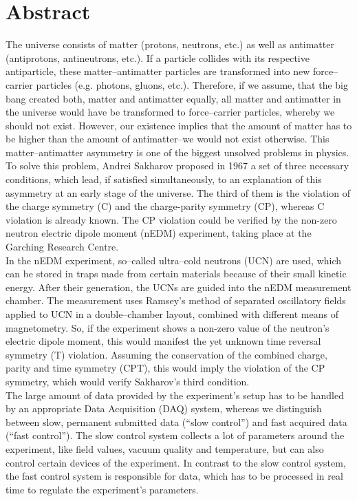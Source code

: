 \chapter*{Abstract}

The universe consists of matter (protons, neutrons, etc.) as well as antimatter (antiprotons, antineutrons, etc.). If a particle collides with its respective antiparticle, these matter--antimatter particles are transformed into new force--carrier particles (e.g. photons, gluons, etc.). Therefore, if we assume, that the big bang created both, matter and antimatter equally, all matter and antimatter in the universe would have be transformed to force--carrier particles, whereby we should not exist. However, our existence implies that the amount of matter has to be higher than the amount of antimatter--we would not exist otherwise. This matter--antimatter asymmetry is one of the biggest unsolved problems in physics.\\

To solve this problem, Andrei Sakharov proposed in 1967 a set of three necessary conditions, which lead, if satisfied simultaneously, to an explanation of this asymmetry at an early stage of the universe. The third of them is the violation of the charge symmetry (C) and the charge-parity symmetry (CP), whereas C violation is already known. The CP violation could be verified by the non-zero neutron electric dipole moment (nEDM) experiment, taking place at the Garching Research Centre.\\

In the nEDM experiment, so--called ultra--cold neutrons (UCN) are used, which can be stored in traps made from certain materials because of their small kinetic energy. After their generation, the UCNs are guided into the nEDM measurement chamber. The measurement uses Ramsey's method of separated oscillatory fields applied to UCN in a double--chamber layout, combined with different means of magnetometry. So, if the experiment shows a non-zero value of the neutron's electric dipole moment, this would manifest the yet unknown time reversal symmetry (T) violation. Assuming the conservation of the combined charge, parity and time symmetry (CPT), this would imply the violation of the CP symmetry, which would verify Sakharov's third condition.\\

The large amount of data provided by the experiment's setup has to be handled by an appropriate Data Acquisition (DAQ) system, whereas we distinguish between slow, permanent submitted data (``slow control'') and fast acquired data (``fast control''). The slow control system collects a lot of parameters around the experiment, like field values, vacuum quality and temperature, but can also control certain devices of the experiment. In contrast to the slow control system, the fast control system is responsible for data, which has to be processed in real time to regulate the experiment's parameters.\\

